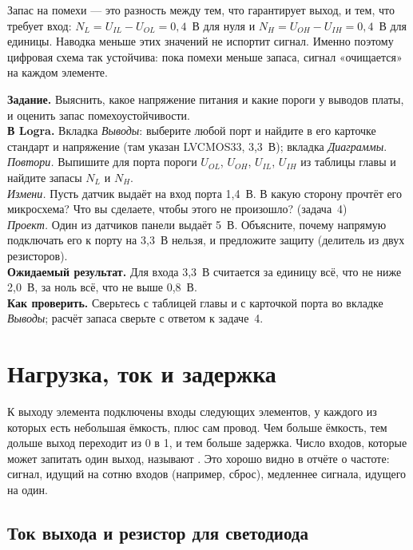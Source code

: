 Запас на помехи --- это разность между тем, что гарантирует выход, и тем,
что требует вход: $N_L = U_{IL}-U_{OL} = 0{,}4$~В для нуля и
$N_H = U_{OH}-U_{IH} = 0{,}4$~В для единицы. Наводка меньше этих значений
не испортит сигнал. Именно поэтому цифровая схема так устойчива: пока помехи
меньше запаса, сигнал «очищается» на каждом элементе.

\begin{diybox}
\textbf{Задание.} Выяснить, какое напряжение питания и какие пороги у выводов
платы, и оценить запас помехоустойчивости.\\
\textbf{В Logra.} Вкладка \emph{Выводы}: выберите любой порт и найдите в его
карточке стандарт и напряжение (там указан LVCMOS33, 3,3~В); вкладка
\emph{Диаграммы}.\\
 \emph{Повтори.} Выпишите для порта пороги $U_{OL}$, $U_{OH}$,
$U_{IL}$, $U_{IH}$ из таблицы главы и найдите запасы $N_L$ и $N_H$.\\
 \emph{Измени.} Пусть датчик выдаёт на вход порта 1,4~В. В какую
сторону прочтёт его микросхема? Что вы сделаете, чтобы этого не произошло?
(задача~4)\\
 \emph{Проект.} Один из датчиков панели выдаёт 5~В. Объясните, почему
напрямую подключать его к порту на 3,3~В нельзя, и предложите защиту (делитель из
двух резисторов).\\
\textbf{Ожидаемый результат.} Для входа 3,3~В считается за единицу всё, что
не ниже 2,0~В, за ноль всё, что не выше 0,8~В.\\
\textbf{Как проверить.} Сверьтесь с таблицей главы и с карточкой порта во
вкладке \emph{Выводы}; расчёт запаса сверьте с ответом к задаче~4.
\end{diybox}

\section{Нагрузка, ток и задержка}

К выходу элемента подключены входы следующих элементов, у каждого из которых
есть небольшая ёмкость, плюс сам провод. Чем больше ёмкость, тем дольше выход
переходит из 0 в 1, и тем больше задержка. Число входов, которые может
запитать один выход, называют . Это
хорошо видно в отчёте о частоте: сигнал, идущий на сотню входов (например,
сброс), медленнее сигнала, идущего на один.

\subsection{Ток выхода и резистор для светодиода}

